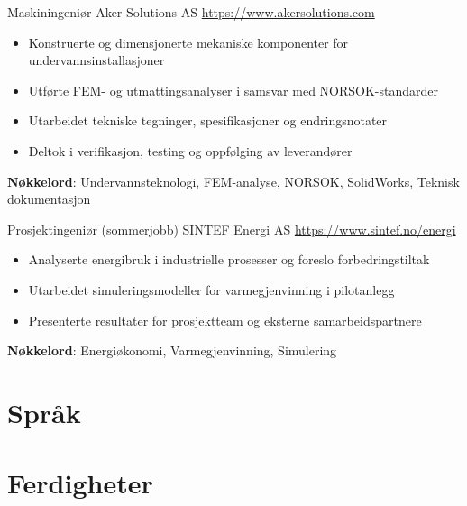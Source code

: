 \documentclass[a4paper, serif, 10pt]{moderncv}
\begin{document}
        {Maskiningeniør}
        {Aker Solutions AS}
        {\url{https://www.akersolutions.com}}
        {}
        {\begin{itemize}
\item Konstruerte og dimensjonerte mekaniske komponenter for undervannsinstallasjoner
\item Utførte FEM- og utmattingsanalyser i samsvar med NORSOK-standarder
\item Utarbeidet tekniske tegninger, spesifikasjoner og endringsnotater
\item Deltok i verifikasjon, testing og oppfølging av leverandører
\end{itemize}
\textbf{Nøkkelord}: Undervannsteknologi, FEM-analyse, NORSOK, SolidWorks, Teknisk dokumentasjon}

        {Prosjektingeniør (sommerjobb)}
        {SINTEF Energi AS}
        {\url{https://www.sintef.no/energi}}
        {}
        {\begin{itemize}
\item Analyserte energibruk i industrielle prosesser og foreslo forbedringstiltak
\item Utarbeidet simuleringsmodeller for varmegjenvinning i pilotanlegg
\item Presenterte resultater for prosjektteam og eksterne samarbeidspartnere
\end{itemize}
\textbf{Nøkkelord}: Energiøkonomi, Varmegjenvinning, Simulering}
\section{Språk}

\section{Ferdigheter}

\end{document}
